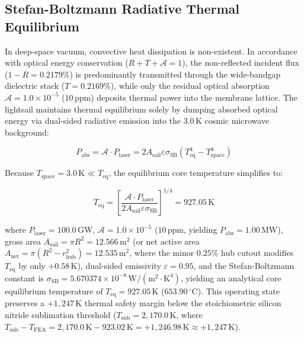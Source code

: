 \documentclass[aps,prd,reprint,superscriptaddress,nofootinbib,floatfix]{revtex4-2}
\begin{document}
\subsection{Stefan-Boltzmann Radiative Thermal Equilibrium}
In deep-space vacuum, convective heat dissipation is non-existent. In accordance with optical energy conservation ($R+T+\mathcal{A}=1$), the non-reflected incident flux ($1-R=0.2179\%$) is predominantly transmitted through the wide-bandgap dielectric stack ($T=0.2169\%$), while only the residual optical absorption $\mathcal{A}=1.0\times 10^{-5}$ ($10\,\mathrm{ppm}$) deposits thermal power into the membrane lattice. The lightsail maintains thermal equilibrium solely by dumping absorbed optical energy via dual-sided radiative emission into the $3.0\,\mathrm{K}$ cosmic microwave background:

\begin{equation}
P_{\mathrm{abs}} = \mathcal{A} \cdot P_{\mathrm{laser}} = 2 A_{\mathrm{sail}} \varepsilon \sigma_{\mathrm{SB}} (T_{\mathrm{eq}}^4 - T_{\mathrm{space}}^4)
\label{eq:thermalpower}
\end{equation}

Because $T_{\mathrm{space}}=3.0\,\mathrm{K} \ll T_{\mathrm{eq}}$, the equilibrium core temperature simplifies to:

\begin{equation}
T_{\mathrm{eq}} = \left[ \frac{\mathcal{A} \cdot P_{\mathrm{laser}}}{2 A_{\mathrm{sail}} \varepsilon \sigma_{\mathrm{SB}}} \right]^{1/4} = 927.05\,\mathrm{K}
\label{eq:teq}
\end{equation}

where $P_{\mathrm{laser}}=100.0\,\mathrm{GW}$, $\mathcal{A}=1.0\times 10^{-5}$ ($10\,\mathrm{ppm}$, yielding $P_{\mathrm{abs}}=1.00\,\mathrm{MW}$), gross area $A_{\mathrm{sail}}=\pi R^2 = 12.566\,\mathrm{m}^2$ (or net active area $A_{\mathrm{net}}=\pi(R^2-r_{\mathrm{hub}}^2)=12.535\,\mathrm{m}^2$, where the minor $0.25\%$ hub cutout modifies $T_{\mathrm{eq}}$ by only $+0.58\,\mathrm{K}$), dual-sided emissivity $\varepsilon=0.95$, and the Stefan-Boltzmann constant is $\sigma_{\mathrm{SB}}=5.670374\times 10^{-8}\,\mathrm{W/(m^2\cdot K^4)}$, yielding an analytical core equilibrium temperature of $T_{\mathrm{eq}}=927.05\,\mathrm{K}$ ($653.90\,^\circ\mathrm{C}$). This operating state preserves a $+1,247\,\mathrm{K}$ thermal safety margin below the stoichiometric silicon nitride sublimation threshold ($T_{\mathrm{sub}}=2,170.0\,\mathrm{K}$, where $T_{\mathrm{sub}}-T_{\mathrm{FEA}}=2,170.0\,\mathrm{K}-923.02\,\mathrm{K}=+1,246.98\,\mathrm{K}\approx +1,247\,\mathrm{K}$).
\end{document}
